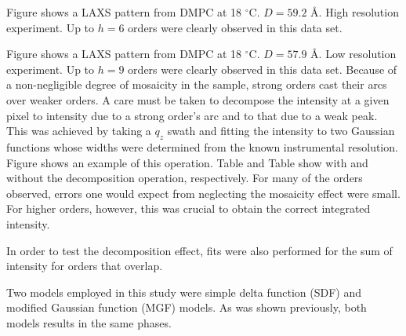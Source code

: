 \documentclass[12pt,letterpaper]{article}
\newcommand{\degC}{$^{\circ}\mathrm{C}$}
\newcommand{\+}{^{\dagger}}%
\begin{document}
Figure shows a LAXS pattern from DMPC at 18 \degC. $D=59.2$ \AA. High 
resolution experiment. Up to $h=6$ orders were clearly observed in this
data set. 

Figure shows a LAXS pattern from DMPC at 18 \degC. $D=57.9$ \AA. Low
resolution experiment. Up to $h=9$ orders were clearly observed in this
data set. Because of a non-negligible degree of mosaicity in the sample,
strong orders cast their arcs over weaker orders. A care must be 
taken to decompose the intensity at a given pixel to intensity due to
a strong order's arc and to that due to a weak peak. This was achieved
by taking a $q_z$ swath and fitting the intensity to two Gaussian
functions whose widths were determined from the known instrumental 
resolution. Figure shows an example of this operation. Table and
Table show with and without the decomposition operation, respectively. 
For many of the orders observed, errors one would expect from 
neglecting the mosaicity effect were small. For higher orders, however,
this was crucial to obtain the correct integrated intensity.

In order to test the decomposition effect, fits were also performed
for the sum of intensity for orders that overlap. 

Two models employed in this study were simple delta function (SDF) and
modified Gaussian function (MGF) models. As was shown previously,
both models results in the same phases.
\end{document}
